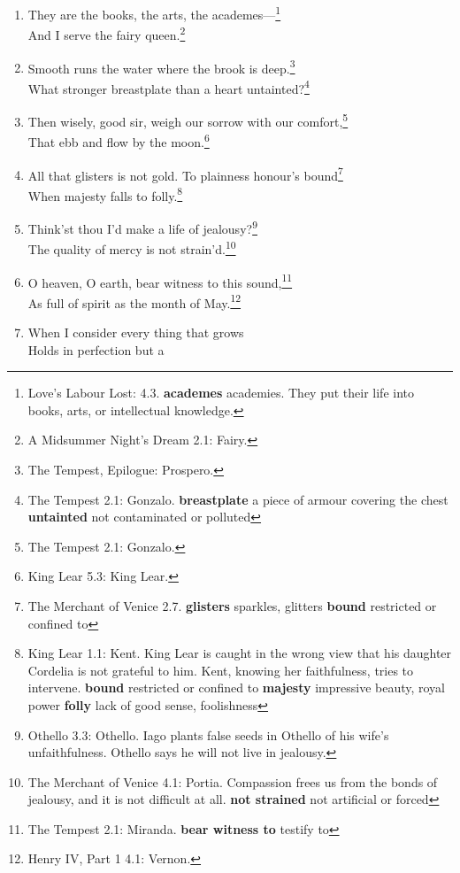\documentclass[17pt,twoside]{extarticle}
\begin{document}
\begin{enumerate}
  returns? \footnote{Hamlet, Prince of Denmark 3.1: Hamlet. What is
    beyond death. \textbf{bourn} boundary}
\item
  They are the books, the arts, the academes---\footnote{Love's Labour
    Lost: 4.3. \textbf{academes} academies. They put their life into
    books, arts, or intellectual knowledge.}\\And I serve the fairy
  queen.\footnote{A Midsummer Night's Dream 2.1: Fairy.}
\item
  Smooth runs the water where the brook is deep.\footnote{The Tempest,
    Epilogue: Prospero.}\\What stronger breastplate than a heart
  untainted?\footnote{The Tempest 2.1: Gonzalo. \textbf{breastplate} a
    piece of armour covering the chest \textbf{untainted} not
    contaminated or polluted}
\item
  Then wisely, good sir, weigh our sorrow with our comfort,\footnote{The
    Tempest 2.1: Gonzalo.}\\That ebb and flow by the moon.\footnote{King
    Lear 5.3: King Lear.}
\item
  All that glisters is not gold. To plainness honour's bound\footnote{The
    Merchant of Venice 2.7. \textbf{glisters} sparkles, glitters
    \textbf{bound} restricted or confined to}\\When majesty falls to
  folly.\footnote{King Lear 1.1: Kent. King Lear is caught in the wrong
    view that his daughter Cordelia is not grateful to him. Kent,
    knowing her faithfulness, tries to intervene. \textbf{bound}
    restricted or confined to \textbf{majesty} impressive beauty, royal
    power \textbf{folly} lack of good sense, foolishness}
\item
  Think'st thou I'd make a life of jealousy?\footnote{Othello 3.3:
    Othello. Iago plants false seeds in Othello of his wife's
    unfaithfulness. Othello says he will not live in jealousy.}\\The
  quality of mercy is not strain'd.\footnote{The Merchant of Venice 4.1:
    Portia. Compassion frees us from the bonds of jealousy, and it is
    not difficult at all. \textbf{not strained} not artificial or forced}
\item
  O heaven, O earth, bear witness to this sound,\footnote{The Tempest
    2.1: Miranda. \textbf{bear witness to} testify to}\\As full of
  spirit as the month of May.\footnote{Henry IV, Part 1 4.1: Vernon.}
\item
  When I consider every thing that grows\\Holds in perfection but a

\end{enumerate}
\end{document}

